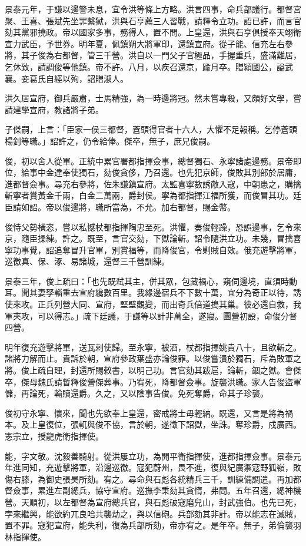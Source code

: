 \begin{pinyinscope}
景泰元年，于謙以邊警未息，宜令洪等條上方略。洪言四事，命兵部議行。都督宮聚、王喜、張斌先坐罪繫獄，洪與石亨薦三人習戰，請釋令立功。詔已許，而言官劾其黨邪撓政。帝以國家多事，務得人，置不問。上皇還，洪與石亨俱授奉天翊衛宣力武臣，予世券。明年夏，佩鎮朔大將軍印，還鎮宣府。從子能、信充左右參將，其子俊為右都督，管三千營。洪自以一門父子官極品，手握重兵，盛滿難居，乞休致，請調俊等他鎮。帝不許。八月，以疾召還京，踰月卒。贈潁國公，謚武襄。妾葛氏自經以殉，詔贈淑人。

洪久居宣府，御兵嚴肅，士馬精強，為一時邊將冠。然未嘗專殺，又頗好文學，嘗請建學宣府，教諸將子弟。

子傑嗣，上言：「臣家一侯三都督，蒼頭得官者十六人，大懼不足報稱。乞停蒼頭楊釗等職。」詔許之，仍令給俸。傑卒，無子，庶兄俊嗣。

俊，初以舍人從軍。正統中累官署都指揮僉事，總督獨石、永寧諸處邊務。景帝即位，給事中金達奉使獨石，劾俊貪侈，乃召還。也先犯京師，俊敗其別部於居庸，進都督僉事。尋充右參將，佐朱謙鎮宣府。太監喜寧數誘敵入寇，中朝患之，購擒斬寧者賞黃金千兩，白金二萬兩，爵封侯。寧為都指揮江福所獲，而俊冒其功。廷臣請如詔。帝以俊邊將，職所當為，不允。加右都督，賜金幣。

俊恃父勢橫恣，嘗以私憾杖都指揮陶忠至死。洪懼，奏俊輕躁，恐誤邊事，乞令來京，隨臣操練。許之。既至，言官交劾，下獄論斬。詔令隨洪立功。未幾，冒擒喜寧功事覺，詔追奪冒升官軍，別賞福等，而降俊官，令剿賊自效。俄充遊擊將軍，巡徼真、保、涿、易諸城，還督三千營訓練。

景泰三年，俊上疏曰：「也先既弒其主，併其眾，包藏禍心，窺伺邊境，直須時動耳。聞其妻孥輜重去宣府纔數百里。我緣邊宿兵不下數十萬，宜分為奇正以待，誘使來攻。正兵列營大同、宣府，堅壁觀變，而出奇兵倍道搗其巢。彼必還自救，我軍夾攻，可以得志。」疏下廷議，于謙等以計非萬全，遂寢。團營初設，命俊分督四營。

明年復充遊擊將軍，送瓦剌使歸。至永寧，被酒，杖都指揮姚貴八十，且欲斬之。諸將力解而止。貴訴於朝，宣府參政葉盛亦論俊罪。以俊嘗潰於獨石，斥為敗軍之將。俊上疏自理，封還所賜敕書，以明己功。言官劾其跋扈，論斬，錮之獄。會傑卒，傑母魏氏請暫釋俊營傑葬事。乃宥死，降都督僉事。旋襲洪職。家人告俊盜軍儲，再論死，輸贖還爵。久之，又以陰事告俊。免死奪爵，命其子珍襲。

俊初守永寧、懷來，聞也先欲奉上皇還，密戒將士毋輕納。既還，又言是將為禍本。及上皇復位，張軏與俊不協，言於朝，遂徵下詔獄，坐誅。奪珍爵，戍廣西。憲宗立，授龍虎衛指揮使。

能，字文敬。沈毅善騎射。從洪屢立功，為開平衛指揮使，進都指揮僉事。景泰元年進同知，充遊擊將軍，沿邊巡徼。寇犯蔚州，畏不進，復與紀廣禦寇野狐嶺，敗傷右膝，為御史張昊所劾。宥之。尋命與石彪各統精兵三千，訓練備調遣。再加都督僉事，累進左副總兵，協守宣府。巡撫李秉劾其貪惰，弗問。五年召還，總神機營。天順初，以左都督為宣府總兵官，與石彪破寇磨兒山，封武強伯。也先已死，孛來繼興，能欲約兀良哈共襲劫之，與以信砲。兵部劾其非計。帝以能志在滅賊，置不罪。寇犯宣府，能失利，復為兵部所劾，帝亦宥之。是年卒。無子，弟倫襲羽林指揮使。


\end{pinyinscope}
